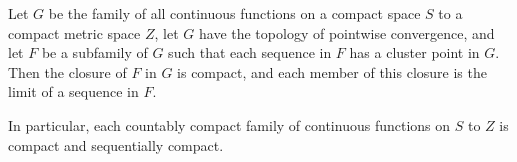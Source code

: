 Let $G$ be the family of all continuous functions on a compact space $S$ to a compact metric space $Z$, let $G$ have the topology of pointwise convergence, and let $F$ be a subfamily of $G$ such that each sequence in $F$ has a cluster point in $G$. Then the closure of $F$ in $G$ is compact, and each member of this closure is the limit of a sequence in $F$.

In particular, each countably compact family of continuous functions on $S$ to $Z$ is compact and sequentially compact.
